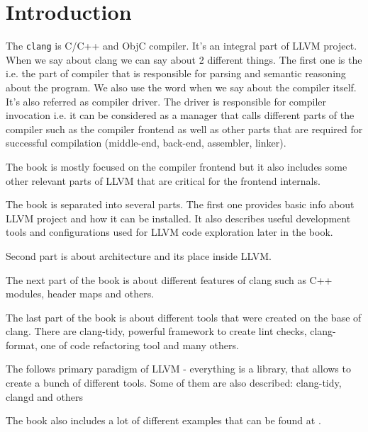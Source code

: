 \chapter{Introduction}

The \texttt{clang} is C/C++ and ObjC compiler. It's an
integral part of LLVM 
project. When we say about clang we can say about 2 different
things. The first one is the  i.e. the part of
compiler that is responsible for parsing and semantic reasoning about
the program. We also use the word \clang when we say
about the compiler itself. It's also referred as compiler driver. The
driver is responsible for compiler invocation i.e. it can be
considered as a manager that calls different parts of the
compiler such as the compiler
frontend as well as other parts that are required for successful
compilation (middle-end, back-end, assembler, linker).

The book is mostly focused on the \clang compiler
frontend but it also includes some other relevant parts of
LLVM that are critical for the frontend internals.

The book is separated into several parts. The first one provides basic
info about LLVM project and how it can be installed. It also describes
useful development tools and configurations used for LLVM code
exploration later in the book.

Second part is about \clang architecture and its
place inside LLVM.

The next part of the book is about different features of clang such as C++
modules, header maps and others.

The last part of the book is about different tools that were created on the base
of clang. There are clang-tidy, powerful framework to create lint checks,
clang-format, one of code refactoring tool and many others.

The \clang follows primary paradigm of LLVM -
everything is a library, that allows to create a bunch of different
tools. Some of them are also described: clang-tidy, clangd and others

The book also includes a lot of different examples that can be found at
\cite{github:clangbook_src}.

